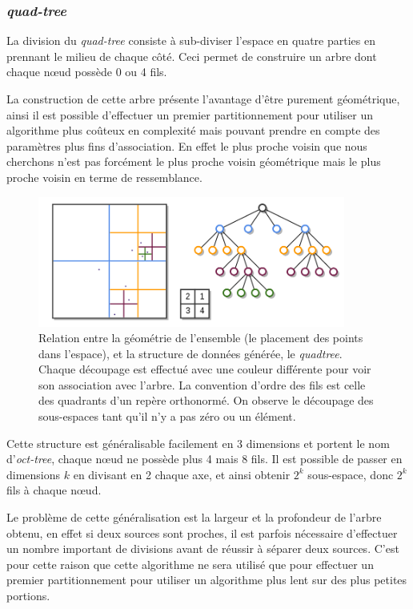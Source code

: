 		\subsubsection{\emph{quad-tree}}

La division du \emph{quad-tree} consiste à sub-diviser l'espace en quatre parties en prennant le milieu de chaque côté. Ceci permet de construire un arbre dont chaque n\oe{}ud possède 0 ou 4 fils.

La construction de cette arbre présente l'avantage d'être purement géométrique, ainsi il est possible d'effectuer un premier partitionnement pour utiliser un algorithme plus coûteux en complexité mais pouvant prendre en compte des paramètres plus fins d'association. En effet le plus proche voisin que nous cherchons n'est pas forcément le plus proche voisin géométrique mais le plus proche voisin en terme de ressemblance.

	\begin{figure}[h]
		\centering
		\includegraphics[width=0.9\textwidth]{img/quadtree.png}
		\caption[Relation entre la géométrie de l'ensemble et le \emph{quadtree} généré]{Relation entre la géométrie de l'ensemble (le placement des points dans l'espace), et la structure de données générée, le \emph{quadtree}. Chaque découpage est effectué avec une couleur différente pour voir son association avec l'arbre. La convention d'ordre des fils est celle des quadrants d'un repère orthonormé. On observe le découpage des sous-espaces tant qu'il n'y a pas zéro ou un élément.}
		\label{fig:quadtree}
	\end{figure}


Cette structure est généralisable facilement en 3 dimensions et portent le nom d'\emph{oct-tree}, chaque n\oe{}ud ne possède plus 4 mais 8 fils. Il est possible de passer en dimensions $k$ en divisant en 2 chaque axe, et ainsi obtenir $2^{k}$ sous-espace, donc $2^{k}$ fils à chaque n\oe{}ud.


Le problème de cette généralisation est la largeur et la profondeur de l'arbre obtenu, en effet si deux sources sont proches, il est parfois nécessaire d'effectuer un nombre important de divisions avant de réussir à séparer deux sources. C'est pour cette raison que cette algorithme ne sera utilisé que pour effectuer un premier partitionnement pour utiliser un algorithme plus lent sur des plus petites portions.



